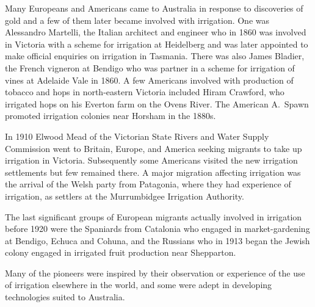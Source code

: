 Many Europeans and Americans came to
Australia in response to discoveries of gold and a few of them later
became involved with irrigation.  One was Alessandro Martelli,
 the Italian architect and engineer
who in 1860 was involved in Victoria with a scheme for irrigation at
Heidelberg and was later appointed to make official enquiries on
irrigation in Tasmania.  There was also James Bladier,  the French vigneron at Bendigo who was partner in a
scheme for irrigation of vines at Adelaide Vale in
1860.  A few Americans involved with production of
tobacco and hops in north-eastern Victoria
included Hiram Crawford,   who irrigated hops on
his Everton farm on the Ovens River.   The
American A.~Spawn  promoted
irrigation colonies near Horsham  in the 1880s.

In 1910 Elwood Mead of the Victorian State Rivers and
Water Supply Commission went to Britain,
Europe, and America seeking migrants to
take up irrigation in Victoria.  Subsequently some
Americans visited the new irrigation settlements but
few remained there.  A major migration affecting irrigation was the
arrival of the Welsh party from Patagonia, where they had
experience of irrigation, as settlers at the Murrumbidgee Irrigation
Authority.

The last significant groups of European migrants
actually involved in irrigation before 1920 were the Spaniards
 from Catalonia who engaged in
market-gardening at Bendigo, Echuca and Cohuna, and
the Russians  who in 1913 began the Jewish colony
engaged in irrigated fruit production near Shepparton.

\bigskip\noindent
Many of the pioneers were inspired by their observation or experience
of the use of irrigation elsewhere in the world, and some were adept
in developing technologies suited to Australia.

